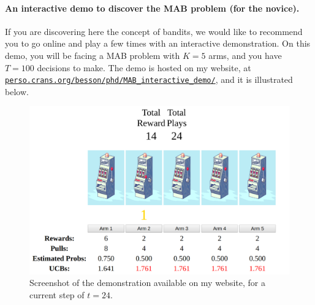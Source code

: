 
\paragraph{An interactive demo to discover the MAB problem (for the novice).}
\label{par:2:interactiveDemoDiscoverMAB}
%
If you are discovering here the concept of bandits, we would like to recommend you to go online and play a few times with an interactive demonstration.
On this demo, you will be facing a MAB problem with $K=5$ arms, and you have $T=100$ decisions to make.
The demo is hosted on my website, at \href{https://perso.crans.org/besson/phd/MAB\_interactive\_demo/}{\texttt{perso.crans.org/besson/phd/MAB\_interactive\_demo/}}, and it is illustrated below.


\begin{figure}[h!]  %
    \centering
    \includegraphics[width=0.85\linewidth]{2-Chapters/2-Chapter/Images/example_of_a_5_arm_bandit_problem.png}
    \caption[Screenshot of the demonstration for a current step of $t=24$.]{Screenshot of the demonstration available on my website, for a current step of $t=24$.}
    \label{fig:2:example_of_a_5_arm_bandit_problem}
\end{figure}


